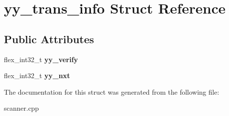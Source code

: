 \hypertarget{structyy__trans__info}{}\section{yy\+\_\+trans\+\_\+info Struct Reference}
\label{structyy__trans__info}
\subsection*{Public Attributes}
\begin{DoxyCompactItemize}
\item 
\mbox{\label{structyy__trans__info_a5c9f61e770deef50bd4e697310342fe9}} 
flex\+\_\+int32\+\_\+t {\bfseries yy\+\_\+verify}
\item 
\mbox{\label{structyy__trans__info_ae0715250c2bef261e596e77e0030f13e}} 
flex\+\_\+int32\+\_\+t {\bfseries yy\+\_\+nxt}
\end{DoxyCompactItemize}


The documentation for this struct was generated from the following file\+:\begin{DoxyCompactItemize}
\item 
scanner.\+cpp\end{DoxyCompactItemize}

